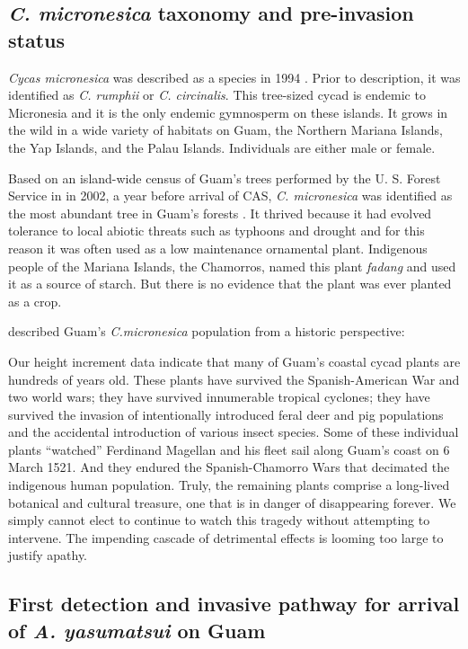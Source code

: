 \documentclass[12pt,letterpaper,english,bibliography=totocnumbered, abstract=on]{scrartcl}
\begin{document}
\subsection{\textit{C. micronesica} taxonomy and pre-invasion status} \textit{Cycas micronesica} was described as a species in 1994 \parencite{hillCycasRumphiiComplex1994}.
Prior to description, it was identified as \textit{C. rumphii} or \textit{C. circinalis}. 
This tree-sized cycad is endemic to Micronesia and it is the only endemic gymnosperm on these islands. It grows in the wild in a wide variety of habitats on Guam, the Northern Mariana Islands, the Yap Islands, and the Palau Islands. Individuals are either male or female.

Based on an island-wide census of Guam's trees performed by the U. S. Forest Service in in 2002, a year before arrival of CAS, \textit{C. micronesica} was identified as the most abundant tree in Guam's forests \cite{donnegon_guams_2004}. It thrived because it had evolved tolerance to local abiotic threats such as typhoons and drought and for this reason it was often used as a low maintenance ornamental plant. Indigenous people of the Mariana Islands, the Chamorros, named this plant \textit{fadang} and used it as a source of starch. But there is no evidence that the plant was ever planted as a crop. 

\cite{haynesExoticInvasivePest2005} described Guam's \textit{C.micronesica} population from a historic perspective:
\begin{displayquote}
	Our height increment data indicate that many of Guam’s coastal cycad plants are hundreds of years old. These plants have survived the Spanish-American War and two world wars; they have survived innumerable tropical cyclones; they have survived the invasion of intentionally introduced feral deer and pig populations and the accidental introduction of various insect species. Some of these individual plants “watched” Ferdinand Magellan and his fleet sail along Guam’s coast on 6 March 1521. And they endured the Spanish-Chamorro Wars that decimated the indigenous human population. Truly, the	remaining plants comprise a long-lived botanical and cultural treasure, one that is in danger of disappearing forever. We simply cannot elect to continue to watch this tragedy without attempting to intervene. The impending cascade of detrimental effects is looming too large to justify apathy.
\end{displayquote}  

\subsection{First detection and invasive pathway for arrival of \textit{A. yasumatsui} on Guam} 
\end{document}
